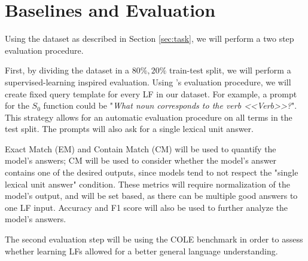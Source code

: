 \documentclass[11pt]{article}
\begin{document}
\section{Baselines and Evaluation}
Using the dataset as described in Section \ref{sec:task}, we will perform a two
step evaluation procedure.

First, by dividing the dataset in a $80\%, 20\%$ train-test split, we will
perform a supervised-learning inspired evaluation. Using
\citet{petrovQALFFrenchQuestionAnswering2025}'s evaluation procedure, we will
create fixed query template for every LF in our dataset. For example, a prompt
for the $S_0$ function could be "\textit{What noun corresponds to the verb
<<Verb>>?}". This strategy allows for an automatic evaluation procedure
on all terms in the test split. The prompts will also ask for a single lexical
unit answer.

Exact Match (EM) and Contain Match (CM)
\cite{petrovQALFFrenchQuestionAnswering2025} will be used to quantify the
model's answers; CM will be used to consider whether the model's answer
contains one of the desired outputs, since models tend to not respect the
"single lexical unit answer" condition. These metrics will require normalization of the
model's output, and will be set based, as there can be multiple good answers to
one LF input. Accuracy and F1 score will also be used to further analyze the
model's answers.

The second evaluation step will be using the COLE benchmark
\cite{beaucheminCOLEComprehensiveBenchmark2025} in order to assess whether
learning LFs allowed for a better general language understanding.


%

\end{document}
